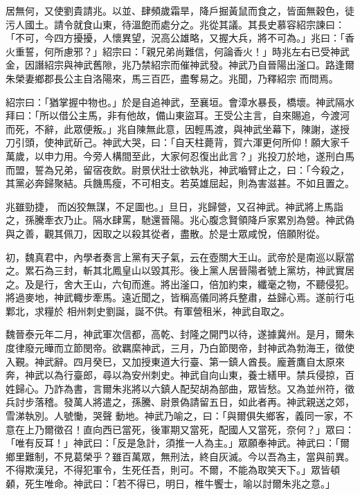 \begin{pinyinscope}
 居無何，又使劉貴請兆。以並、肆頻歲霜旱，降戶掘黃鼠而食之，皆面無穀色，徒污人國土。請令就食山東，待溫飽而處分之。兆從其議。其長史慕容紹宗諫曰：「不可，今四方擾擾，人懷異望，況高公雄略，又握大兵，將不可為。」兆曰：「香火重誓，何所慮邪？」紹宗曰：「親兄弟尚難信，何論香火！」時兆左右已受神武金，因譖紹宗與神武舊隙，兆乃禁紹宗而催神武發。神武乃自晉陽出滏口。路逢爾朱榮妻鄉郡長公主自洛陽來，馬三百匹，盡奪易之。兆聞，乃釋紹宗
 而問焉。



 紹宗曰：「猶掌握中物也。」於是自追神武，至襄垣。會漳水暴長，橋壞。神武隔水拜曰：「所以借公主馬，非有他故，備山東盜耳。王受公主言，自來賜追，今渡河而死，不辭，此眾便叛。」兆自陳無此意，因輕馬渡，與神武坐幕下，陳謝，遂授刀引頭，使神武斫己。神武大哭，曰：「自天柱薨背，賀六渾更何所仰！願大家千萬歲，以申力用。今旁人構間至此，大家何忍復出此言？」兆投刀於地，遂刑白馬而盟，誓為兄弟，留宿夜飲。尉景伏壯士欲執兆，神武嚙臂止之，曰：「今殺之，其黨必奔歸聚結。兵饑馬瘦，不可相支。若英雄屈起，則為害滋甚。不如且置之。



 兆雖勁捷，
 而凶狡無謀，不足圖也。」旦日，兆歸營，又召神武。神武將上馬詣之，孫騰牽衣乃止。隔水肆罵，馳還晉陽。兆心腹念賢領降戶家累別為營。神武偽與之善，觀其佩刀，因取之以殺其從者，盡散。於是士眾咸悅，倍願附從。



 初，魏真君中，內學者奏言上黨有天子氣，云在壺關大王山。武帝於是南巡以厭當之。累石為三封，斬其北鳳皇山以毀其形。後上黨人居晉陽者號上黨坊，神武實居之。及是行，舍大王山，六旬而進。將出滏口，倍加約束，纖毫之物，不聽侵犯。將過麥地，神武輙步牽馬。遠近聞之，皆稱高儀同將兵整肅，益歸心焉。遂前行屯鄴北，求糧於
 相州刺史劉誕，誕不供。有軍營租米，神武自取之。



 魏晉泰元年二月，神武軍次信都，高乾、封隆之開門以待，遂據冀州。是月，爾朱度律廢元曄而立節閔帝。欲羈縻神武，三月，乃白節閔帝，封神武為勃海王，徵使入覲。神武辭。四月癸巳，又加授東道大行臺、第一鎮人酋長。龐蒼鷹自太原來奔，神武以為行臺郎，尋以為安州刺史。神武自向山東，養士繕甲。禁兵侵掠，百姓歸心。乃詐為書，言爾朱兆將以六鎮人配契胡為部曲，眾皆愁。又為並州符，徵兵討步落稽。發萬人將遣之，孫騰、尉景偽請留五日，如此者再。神武親送之郊，雪涕執別。人號慟，哭聲
 動地。神武乃喻之，曰：「與爾俱失鄉客，義同一家，不意在上乃爾徵召！直向西已當死，後軍期又當死，配國人又當死，奈何？」眾曰：「唯有反耳！」神武曰：「反是急計，須推一人為主。」眾願奉神武。神武曰：「爾鄉里難制，不見葛榮乎？雖百萬眾，無刑法，終自灰滅。今以吾為主，當與前異。不得欺漢兒，不得犯軍令，生死任吾，則可。不爾，不能為取笑天下。」眾皆頓顙，死生唯命。神武曰：「若不得已，明日，椎牛饗士，喻以討爾朱兆之意。」




\end{pinyinscope}

